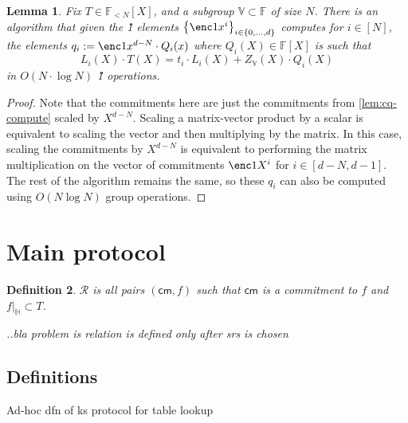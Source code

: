 \documentclass[11pt]{article} %
\newcommand{\F}{\ensuremath{\mathbb F}\xspace}
\newcommand{\cm}{\ensuremath{\mathsf{cm}}\xspace}
\newcommand{\defeq}{:=}
\newcommand{\sett}[2]{\ensuremath{\set{#1}_{#2}}\xspace}
\newcommand{\rel}{\ensuremath{\mathcal{R}}\xspace}
\newcommand{\set}[1]{\ensuremath{\left\{#1\right\}}\xspace}
\newcommand{\polysofdeg}[1]{\ensuremath{\F_{< #1}[X]}\xspace}
\newtheorem{lemma}{Lemma}[section]
\newtheorem{dfn}[lemma]{Definition}
\newcommand{\subspace}{\ensuremath{\mathbb{H}}\xspace}
\newcommand{\bigspace}{\ensuremath{\mathbb{V}}\xspace}
\newcommand{\tabsize}{\ensuremath{N}\xspace}
\newcommand{\tabruntime}{\ensuremath{\tabsize\log\tabsize}\xspace}
\begin{document}
\begin{lemma}
Fix $T\in \polysofdeg{\tabsize}$, and a subgroup $\bigspace\subset \F$ of size \tabsize. 
There is an algorithm that given the \G1 elements $\sett{\enc1{x^i}}{i\in \set{0,\ldots,d}}$ computes for $i\in [\tabsize]$, the elements 
$q_i\defeq \enc1{x^{d-\tabsize}\cdot Q_i(x)}$
where $Q_i(X)\in \F[X]$ is such that
\[L_i(X)\cdot T(X)=t_i\cdot L_i(X) + Z_\bigspace(X)\cdot Q_i(X)\]
in $O(\tabsize\cdot \log \tabsize)$ \G1 operations.
 
\end{lemma}
\begin{proof}
    Note that the commitments here are just the commitments from
    \ref{lem:cq-compute} scaled by $X^{d - \tabsize}$. Scaling a matrix-vector
    product by a scalar is equivalent to scaling the vector and then multiplying
    by the matrix. In this case, scaling the commitments by $X^{d - \tabsize}$ is
    equivalent to performing the matrix multiplication on the vector of
    commitments $\enc1{X^i}$ for $i \in [d-\tabsize, d-1]$. The rest of the
    algorithm remains the same, so these $q_i$ can also be computed using
    $O(\tabruntime)$ group operations.
\end{proof}


\section{Main protocol}
\begin{dfn}\label{dfn:mainrelation}
 \rel is all pairs $(\cm,f)$
 such that \cm is a commitment to $f$ and $f|_\subspace \subset T$.
 
 ..bla  problem is relation is defined only after srs is chosen
\end{dfn}

\subsection{Definitions}

Ad-hoc dfn of ks protocol for table lookup
\end{document}
